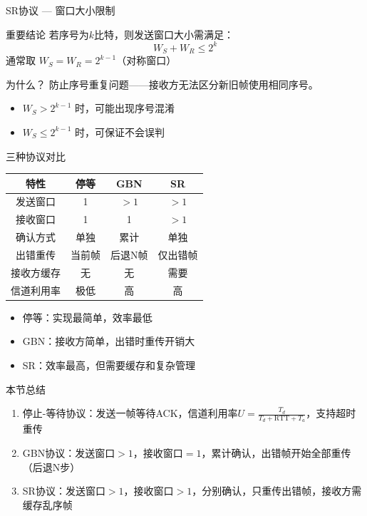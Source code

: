 \documentclass[10pt, aspectratio=169]{beamer}
\begin{document}
\begin{frame}{SR协议 --- 窗口大小限制}
    \begin{block}{重要结论}
        若序号为$k$比特，则发送窗口大小需满足：
        \[
        W_S + W_R \le 2^k
        \]
        通常取 $W_S = W_R = 2^{k-1}$（对称窗口）
    \end{block}
    \vspace{0.5em}
    \begin{exampleblock}{为什么？}
        防止序号重复问题——接收方无法区分新旧帧使用相同序号。
        \begin{itemize}
            \item $W_S > 2^{k-1}$ 时，可能出现序号混淆
            \item $W_S \le 2^{k-1}$ 时，可保证不会误判
        \end{itemize}
    \end{exampleblock}
\end{frame}

\begin{frame}{三种协议对比}
    \begin{table}
        \centering
        \begin{tabular}{|c|c|c|c|}
            \hline
            \textbf{特性} & \textbf{停等} & \textbf{GBN} & \textbf{SR} \\
            \hline
            发送窗口 & 1 & $>1$ & $>1$ \\
            接收窗口 & 1 & 1 & $>1$ \\
            确认方式 & 单独 & 累计 & 单独 \\
            出错重传 & 当前帧 & 后退N帧 & 仅出错帧 \\
            接收方缓存 & 无 & 无 & 需要 \\
            信道利用率 & 极低 & 高 & 高 \\
            \hline
        \end{tabular}
    \end{table}
    \vspace{0.5em}
    \begin{itemize}
        \item 停等：实现最简单，效率最低
        \item GBN：接收方简单，出错时重传开销大
        \item SR：效率最高，但需要缓存和复杂管理
    \end{itemize}
\end{frame}

\begin{frame}{本节总结}
    \begin{enumerate}
        \item 停止-等待协议：发送一帧等待ACK，信道利用率$U = \frac{T_d}{T_d + \text{RTT} + T_a}$，支持超时重传
        \item GBN协议：发送窗口$>1$，接收窗口$=1$，累计确认，出错帧开始全部重传（后退N步）
        \item SR协议：发送窗口$>1$，接收窗口$>1$，分别确认，只重传出错帧，接收方需缓存乱序帧
    \end{enumerate}
\end{frame}
\end{document}
